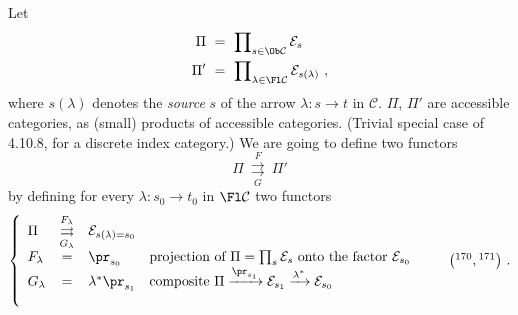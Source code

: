 Let
\[
\begin{aligned}
\Pi \ &= \ \prod\nolimits_{s\in\Ob\mathcal{C}} \mathcal{E}_s\\
\Pi' \ &= \ \prod\nolimits_{\lambda\in\Fl\mathcal{C}} \mathcal{E}_{s(\lambda)} \ ,
\end{aligned}
\]
where $s(\lambda)$ denotes the \textit{source} $s$ of the arrow $\lambda : s \longrightarrow t$ in $\mathcal{C}$. $\Pi$, $\Pi'$ are accessible categories, as (small) products of accessible categories. (Trivial special case of 4.10.8, for a discrete index category.) We are going to define two functors
\[
\Pi \ \overset{F}{\underset{G}{\rightrightarrows}} \ \Pi'
\]
by defining for every $\lambda : s_0 \longrightarrow t_0$ in $\Fl\mathcal{C}$ two functors
\[
\left\{
\begin{array}{lcll}
\Pi & \overset{F_\lambda}{\underset{G_\lambda}{\rightrightarrows}} & \mathcal{E}_{s(\lambda)=s_0} & \\
F_\lambda & = & \pr_{s_0} & \text{projection of } \Pi = \prod\nolimits_s \mathcal{E}_s \text{ onto the factor } \mathcal{E}_{s_0}\\
G_\lambda & = & \lambda^*\pr_{s_1} & \text{composite } \Pi \xrightarrow{\pr_{s_1}} \mathcal{E}_{s_1} \xrightarrow{\lambda^*} \mathcal{E}_{s_0}\\
 & & & 
\end{array}
\right.
\qquad \bigl(\mbox{\footnotemark[170]}, \mbox{\footnotemark[171]}\bigr) \ .
\]

